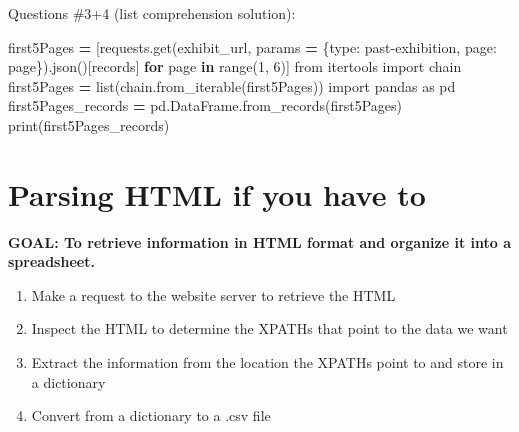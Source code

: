 \documentclass[
]{book}
\newenvironment{Shaded}{\begin{snugshade}}{\end{snugshade}}
\newcommand{\BuiltInTok}[1]{#1}
\newcommand{\ControlFlowTok}[1]{\textcolor[rgb]{0.13,0.29,0.53}{\textbf{#1}}}
\newcommand{\DecValTok}[1]{\textcolor[rgb]{0.00,0.00,0.81}{#1}}
\newcommand{\ImportTok}[1]{#1}
\newcommand{\KeywordTok}[1]{\textcolor[rgb]{0.13,0.29,0.53}{\textbf{#1}}}
\newcommand{\NormalTok}[1]{#1}
\newcommand{\OperatorTok}[1]{\textcolor[rgb]{0.81,0.36,0.00}{\textbf{#1}}}
\newcommand{\StringTok}[1]{\textcolor[rgb]{0.31,0.60,0.02}{#1}}
\providecommand{\tightlist}{%
  \setlength{\itemsep}{0pt}\setlength{\parskip}{0pt}}
\begin{document}
\begin{alert}
Questions \#3+4 (list comprehension solution):

\begin{Shaded}
\begin{Highlighting}[]
\NormalTok{first5Pages }\OperatorTok{=}\NormalTok{ [requests.get(exhibit\_url, params }\OperatorTok{=}\NormalTok{ \{}\StringTok{\textquotesingle{}type\textquotesingle{}}\NormalTok{: }\StringTok{\textquotesingle{}past{-}exhibition\textquotesingle{}}\NormalTok{, }\StringTok{\textquotesingle{}page\textquotesingle{}}\NormalTok{: page\}).json()[}\StringTok{\textquotesingle{}records\textquotesingle{}}\NormalTok{] }\ControlFlowTok{for}\NormalTok{ page }\KeywordTok{in} \BuiltInTok{range}\NormalTok{(}\DecValTok{1}\NormalTok{, }\DecValTok{6}\NormalTok{)]}
\ImportTok{from}\NormalTok{ itertools }\ImportTok{import}\NormalTok{ chain}
\NormalTok{first5Pages }\OperatorTok{=} \BuiltInTok{list}\NormalTok{(chain.from\_iterable(first5Pages))}
\ImportTok{import}\NormalTok{ pandas }\ImportTok{as}\NormalTok{ pd}
\NormalTok{first5Pages\_records }\OperatorTok{=}\NormalTok{ pd.DataFrame.from\_records(first5Pages)}
\BuiltInTok{print}\NormalTok{(first5Pages\_records)}
\end{Highlighting}
\end{Shaded}

\end{alert}

\hypertarget{parsing-html-if-you-have-to}{%
\section{Parsing HTML if you have to}\label{parsing-html-if-you-have-to}}

\begin{alert}

\textbf{GOAL: To retrieve information in HTML format and organize it into a spreadsheet.}

\begin{enumerate}
\def\labelenumi{\arabic{enumi}.}
\tightlist
\item
  Make a request to the website server to retrieve the HTML
\item
  Inspect the HTML to determine the XPATHs that point to the data we want
\item
  Extract the information from the location the XPATHs point to and store in a dictionary
\item
  Convert from a dictionary to a .csv file
\end{enumerate}

\end{alert}
\end{document}
